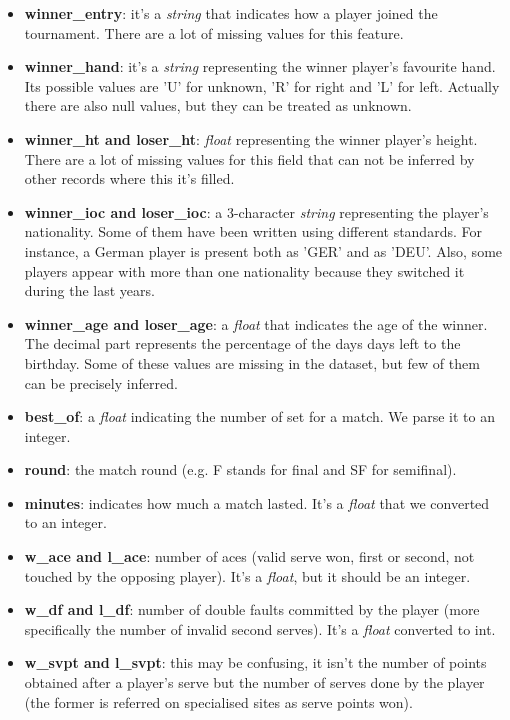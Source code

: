 \begin{itemize}
    \item \textbf{winner\_entry}: it's a \textit{string} that indicates how a player joined the tournament. There are a lot of missing values for this feature.
    \item \textbf{winner\_hand}: it's a \textit{string} representing the winner player's favourite hand. Its possible values are 'U' for unknown, 'R' for right and 'L' for left. Actually there are also null values, but they can be treated as unknown.
    \item \textbf{winner\_ht and loser\_ht}: \textit{float} representing the winner player's height. There are a lot of missing values for this field that can not be inferred by other records where this it's filled.
    \item \textbf{winner\_ioc and loser\_ioc}: a 3-character \textit{string} representing the player's nationality. Some of them have been written using different standards. For instance, a German player is present both as 'GER' and as 'DEU'. Also, some players appear with more than one nationality because they switched it during the last years.
    \item \textbf{winner\_age and loser\_age}: a \textit{float} that indicates the age of the winner. The decimal part represents the percentage of the days days left to the birthday. Some of these values are missing in the dataset, but few of them can be precisely inferred.
    \item \textbf{best\_of}: a \textit{float} indicating the number of set for a match. We parse it to an integer.
    \item \textbf{round}: the match round (e.g. F stands for final and SF for semifinal).
    \item \textbf{minutes}: indicates how much a match lasted. It's a \textit{float} that we converted to an integer.
    \item \textbf{w\_ace and l\_ace}: number of aces (valid serve won, first or second, not touched by the opposing player). It's a \textit{float}, but it should be an integer.
    \item \textbf{w\_df and l\_df}: number of double faults committed by the player (more specifically the number of invalid second serves). It's a \textit{float} converted to int.
    \item \textbf{w\_svpt and l\_svpt}: this may be confusing, it isn't the number of points obtained after a player's serve but the number of serves done by the player (the former is referred on specialised sites as serve points won).

\end{itemize}
